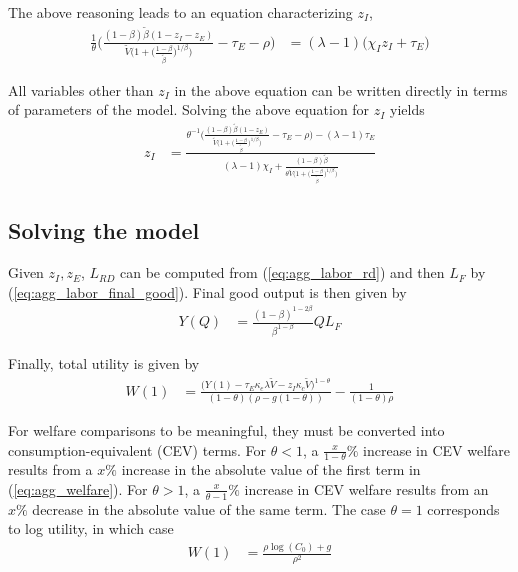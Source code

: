 \documentclass[12pt,english]{article}
\theoremstyle{remark}
\begin{document}
The above reasoning leads to an equation characterizing $z_I$, 
\begin{align}
	\frac{1}{\theta} \Bigg( \frac{(1-\beta)\tilde{\beta}(1- z_I - z_E)}{\tilde{V}\Big(1 + \big(\frac{1-\beta}{\tilde{\beta}}\big)^{1/\beta}\Big)} - \tau_E - \rho \Bigg) &= (\lambda - 1)\big(\chi_Iz_I + \tau_E \big)
\end{align}

All variables other than $z_I$ in the above equation can be written directly in terms of parameters of the model. Solving the above equation for $z_I$ yields
\begin{align}
	z_I &= \frac{\theta^{-1}\Bigg( \frac{(1-\beta)\tilde{\beta}(1- z_E)}{\tilde{V}\big(1 + \big(\frac{1-\beta}{\tilde{\beta}}\big)^{1/\beta}\big)} - \tau_E - \rho \Bigg) - (\lambda-1) \tau_E}{(\lambda - 1) \chi_I + \frac{(1-\beta)\tilde{\beta}}{\theta \tilde{V}\big(1 + \big(\frac{1-\beta}{\tilde{\beta}}\big)^{1/\beta}\big)}} \label{eq:effort_incumbent}
\end{align}

\subsection{Solving the model}

Given $z_I,z_E$, $L_{RD}$ can be computed from (\ref{eq:agg_labor_rd}) and then $L_F$ by (\ref{eq:agg_labor_final_good}). Final good output is then given by
\begin{align}
	Y(Q) &= \frac{(1-\beta)^{1-2\beta}}{\beta^{1-\beta}} Q L_F \label{eq:agg_final_good_output}
\end{align}

Finally, total utility is given by 
\begin{align}
	W(1) &= \frac{\big(Y(1) - \tau_E \kappa_{e} \lambda \tilde{V} - z_I \kappa_{c} \tilde{V}\big)^{1-\theta}}{(1-\theta)(\rho - g(1-\theta))} - \frac{1}{(1-\theta)\rho} \label{eq:agg_welfare}
\end{align}

For welfare comparisons to be meaningful, they must be converted into consumption-equivalent (CEV) terms. For $\theta < 1$, a $\frac{x}{1-\theta}\%$ increase in CEV welfare results from a $x\%$ increase in the absolute value of the first term in (\ref{eq:agg_welfare}). For $\theta > 1$, a $\frac{x}{\theta-1}\%$ increase in CEV welfare results from an $x\%$ decrease in the absolute value of the same term. The case $\theta = 1$ corresponds to log utility, in which case
\begin{align}
	W(1) &= \frac{\rho \log(C_0) + g}{\rho^2} \label{eq:agg_welfare_log}
\end{align}
\end{document}
